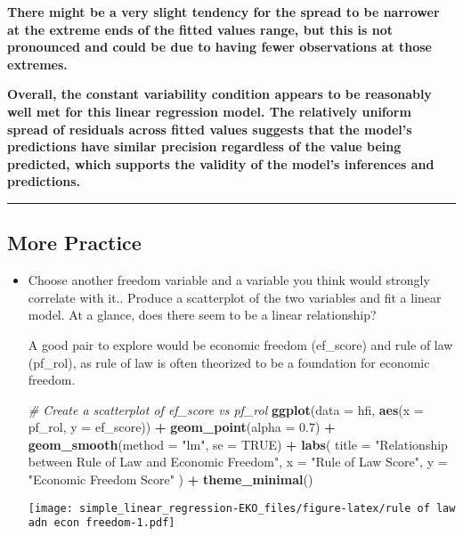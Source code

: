\documentclass[
]{article}
\newenvironment{Shaded}{\begin{snugshade}}{\end{snugshade}}
\newcommand{\AttributeTok}[1]{\textcolor[rgb]{0.13,0.29,0.53}{#1}}
\newcommand{\CommentTok}[1]{\textcolor[rgb]{0.56,0.35,0.01}{\textit{#1}}}
\newcommand{\ConstantTok}[1]{\textcolor[rgb]{0.56,0.35,0.01}{#1}}
\newcommand{\FloatTok}[1]{\textcolor[rgb]{0.00,0.00,0.81}{#1}}
\newcommand{\FunctionTok}[1]{\textcolor[rgb]{0.13,0.29,0.53}{\textbf{#1}}}
\newcommand{\NormalTok}[1]{#1}
\newcommand{\SpecialCharTok}[1]{\textcolor[rgb]{0.81,0.36,0.00}{\textbf{#1}}}
\newcommand{\StringTok}[1]{\textcolor[rgb]{0.31,0.60,0.02}{#1}}
\begin{document}
\textbf{There might be a very slight tendency for the spread to be
narrower at the extreme ends of the fitted values range, but this is not
pronounced and could be due to having fewer observations at those
extremes.}

\textbf{Overall, the constant variability condition appears to be
reasonably well met for this linear regression model. The relatively
uniform spread of residuals across fitted values suggests that the
model's predictions have similar precision regardless of the value being
predicted, which supports the validity of the model's inferences and
predictions.}

\begin{center}\rule{0.5\linewidth}{0.5pt}\end{center}

\subsection{More Practice}\label{more-practice}

\begin{itemize}
\item
  Choose another freedom variable and a variable you think would
  strongly correlate with it.. Produce a scatterplot of the two
  variables and fit a linear model. At a glance, does there seem to be a
  linear relationship?

  A good pair to explore would be economic freedom (ef\_score) and rule
  of law (pf\_rol), as rule of law is often theorized to be a foundation
  for economic freedom.

\begin{Shaded}
\begin{Highlighting}[]
\CommentTok{\# Create a scatterplot of ef\_score vs pf\_rol}
\FunctionTok{ggplot}\NormalTok{(}\AttributeTok{data =}\NormalTok{ hfi, }\FunctionTok{aes}\NormalTok{(}\AttributeTok{x =}\NormalTok{ pf\_rol, }\AttributeTok{y =}\NormalTok{ ef\_score)) }\SpecialCharTok{+}
  \FunctionTok{geom\_point}\NormalTok{(}\AttributeTok{alpha =} \FloatTok{0.7}\NormalTok{) }\SpecialCharTok{+}
  \FunctionTok{geom\_smooth}\NormalTok{(}\AttributeTok{method =} \StringTok{"lm"}\NormalTok{, }\AttributeTok{se =} \ConstantTok{TRUE}\NormalTok{) }\SpecialCharTok{+}
  \FunctionTok{labs}\NormalTok{(}
    \AttributeTok{title =} \StringTok{"Relationship between Rule of Law and Economic Freedom"}\NormalTok{,}
    \AttributeTok{x =} \StringTok{"Rule of Law Score"}\NormalTok{,}
    \AttributeTok{y =} \StringTok{"Economic Freedom Score"}
\NormalTok{  ) }\SpecialCharTok{+}
  \FunctionTok{theme\_minimal}\NormalTok{()}
\end{Highlighting}
\end{Shaded}

  \texttt{[image: simple\_linear\_regression-EKO\_files/figure-latex/rule of law adn econ freedom-1.pdf]}
\end{itemize}
\end{document}
